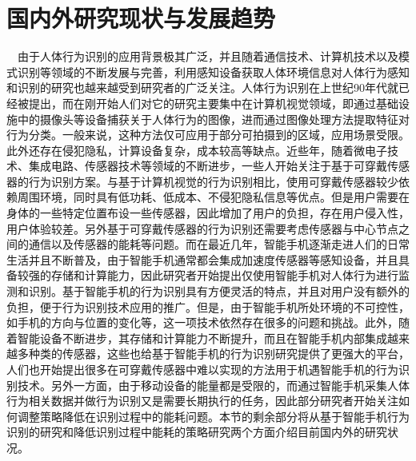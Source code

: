 \section{国内外研究现状与发展趋势}
\par　由于人体行为识别的应用背景极其广泛，并且随着通信技术、计算机技术以及模式识别等领域的不断发展与完善，利用感知设备获取人体环境信息对人体行为感知和识别的研究也越来越受到研究者的广泛关注。人体行为识别在上世纪90年代就已经被提出，而在刚开始人们对它的研究主要集中在计算机视觉领域，即通过基础设施中的摄像头等设备捕获关于人体行为的图像，进而通过图像处理方法提取特征对行为分类。一般来说，这种方法仅可应用于部分可拍摄到的区域\cite{oneSensorbased}，应用场景受限。此外还存在侵犯隐私，计算设备复杂，成本较高等缺点\cite{reviewOnSensorbased}。近些年，随着微电子技术、集成电路、传感器技术等领域的不断进步，一些人开始关注于基于可穿戴传感器的行为识别方案\cite{surveyOnSensorBased}。与基于计算机视觉的行为识别相比，使用可穿戴传感器较少依赖周围环境，同时具有低功耗、低成本、不侵犯隐私信息等优点。但是用户需要在身体的一些特定位置布设一些传感器，因此增加了用户的负担，存在用户侵入性，用户体验较差。另外基于可穿戴传感器的行为识别还需要考虑传感器与中心节点之间的通信以及传感器的能耗等问题。而在最近几年，智能手机逐渐走进人们的日常生活并且不断普及，由于智能手机通常都会集成加速度传感器等感知设备，并且具备较强的存储和计算能力\cite{surveyOnMobileSensing}，因此研究者开始提出仅使用智能手机对人体行为进行监测和识别。基于智能手机的行为识别具有方便灵活的特点，并且对用户没有额外的负担，便于行为识别技术应用的推广。但是，由于智能手机所处环境的不可控性，如手机的方向与位置的变化等，这一项技术依然存在很多的问题和挑战。此外，随着智能设备不断进步，其存储和计算能力不断提升，而且在智能手机内部集成越来越多种类的传感器，这些也给基于智能手机的行为识别研究提供了更强大的平台，人们也开始提出很多在可穿戴传感器中难以实现的方法用于机遇智能手机的行为识别技术。另外一方面，由于移动设备的能量都是受限的，而通过智能手机采集人体行为相关数据并做行为识别又是需要长期执行的任务，因此部分研究者开始关注如何调整策略降低在识别过程中的能耗问题。本节的剩余部分将从基于智能手机行为识别的研究和降低识别过程中能耗的策略研究两个方面介绍目前国内外的研究状况。

